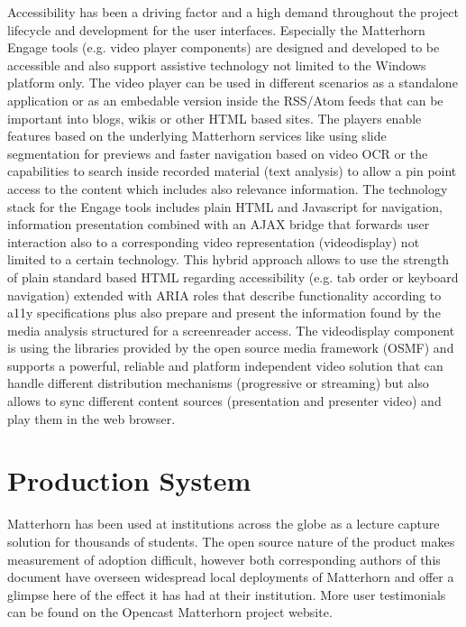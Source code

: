 \documentclass{sig-alternate}
\begin{document}
Accessibility has been a driving factor and a high demand throughout the project lifecycle and development for the user interfaces. Especially the Matterhorn Engage tools (e.g. video player components) are designed and developed to be accessible and also support assistive technology not limited to the Windows platform only. The video player can be used in different scenarios as a standalone application or as an embedable version inside the RSS/Atom feeds that can be important into blogs, wikis or other HTML based sites. The players enable features based on the underlying Matterhorn services like using slide segmentation for previews and faster navigation based on video OCR or the capabilities to search inside recorded material (text analysis) to allow a pin point access to the content which includes also relevance information. The technology stack for the Engage tools includes plain HTML and Javascript for navigation, information presentation combined with an AJAX bridge that forwards user interaction also to a corresponding video representation (videodisplay) not limited to a certain technology. This hybrid approach allows to use the strength of plain standard based HTML regarding accessibility (e.g. tab order or keyboard navigation) extended with ARIA roles that describe functionality according to a11y specifications plus also prepare and present the information found by the media analysis structured for a screenreader access. 
The videodisplay component is using the libraries provided by the open source media framework (OSMF) and supports a powerful, reliable and platform independent video solution that can handle different distribution mechanisms (progressive or streaming) but also allows to sync different content sources (presentation and presenter video) and play them in the web browser.


\section{Production System}
Matterhorn has been used at institutions across the globe as a lecture capture solution for thousands of students.  The open source nature of the product makes measurement of adoption difficult, however both corresponding authors of this document have overseen widespread local deployments of Matterhorn and offer a glimpse here of the effect it has had at their institution.  More user testimonials can be found on the Opencast Matterhorn project website.
\end{document}
